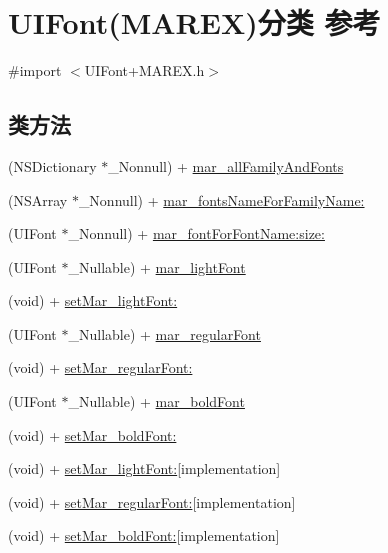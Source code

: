 \hypertarget{category_u_i_font_07_m_a_r_e_x_08}{}\section{U\+I\+Font(M\+A\+R\+EX)分类 参考}
\label{category_u_i_font_07_m_a_r_e_x_08}


{\ttfamily \#import $<$U\+I\+Font+\+M\+A\+R\+E\+X.\+h$>$}

\subsection*{类方法}
\begin{DoxyCompactItemize}
\item 
(N\+S\+Dictionary $\ast$\+\_\+\+Nonnull) + \hyperlink{category_u_i_font_07_m_a_r_e_x_08_a6c099d0e89ea650f01a5a5ee5fb5fad8}{mar\+\_\+all\+Family\+And\+Fonts}
\item 
(N\+S\+Array $\ast$\+\_\+\+Nonnull) + \hyperlink{category_u_i_font_07_m_a_r_e_x_08_a4c584f7afd805419abed093b9afc5e36}{mar\+\_\+fonts\+Name\+For\+Family\+Name\+:}
\item 
(U\+I\+Font $\ast$\+\_\+\+Nonnull) + \hyperlink{category_u_i_font_07_m_a_r_e_x_08_ae6b986412ec719c806824e5461358197}{mar\+\_\+font\+For\+Font\+Name\+:size\+:}
\item 
(U\+I\+Font $\ast$\+\_\+\+Nullable) + \hyperlink{category_u_i_font_07_m_a_r_e_x_08_a62d3d3600e1f882e3cc89d3245d80d22}{mar\+\_\+light\+Font}
\item 
(void) + \hyperlink{category_u_i_font_07_m_a_r_e_x_08_a9fffcc9cd99a52cb29bbdc3ea9883d9a}{set\+Mar\+\_\+light\+Font\+:}
\item 
(U\+I\+Font $\ast$\+\_\+\+Nullable) + \hyperlink{category_u_i_font_07_m_a_r_e_x_08_a08a1777c1f548b94d45923916db96d2e}{mar\+\_\+regular\+Font}
\item 
(void) + \hyperlink{category_u_i_font_07_m_a_r_e_x_08_a85d18fa87563106d4ee05af69e4d1b66}{set\+Mar\+\_\+regular\+Font\+:}
\item 
(U\+I\+Font $\ast$\+\_\+\+Nullable) + \hyperlink{category_u_i_font_07_m_a_r_e_x_08_a3b683bba5cf11f59c9a7298f01d58a51}{mar\+\_\+bold\+Font}
\item 
(void) + \hyperlink{category_u_i_font_07_m_a_r_e_x_08_ad6c7f3193d54a3887ebf81387067fb1d}{set\+Mar\+\_\+bold\+Font\+:}
\item 
(void) + \hyperlink{category_u_i_font_07_m_a_r_e_x_08_ad03d7e6e5dd94288cd43103595d11813}{set\+Mar\+\_\+light\+Font\+:}{\ttfamily  \mbox{[}implementation\mbox{]}}
\item 
(void) + \hyperlink{category_u_i_font_07_m_a_r_e_x_08_a2308a1349301ab3f2b710c9ed1c2c3fa}{set\+Mar\+\_\+regular\+Font\+:}{\ttfamily  \mbox{[}implementation\mbox{]}}
\item 
(void) + \hyperlink{category_u_i_font_07_m_a_r_e_x_08_ac8297edb17b16f48d2efd5d9fa770677}{set\+Mar\+\_\+bold\+Font\+:}{\ttfamily  \mbox{[}implementation\mbox{]}}
\end{DoxyCompactItemize}


